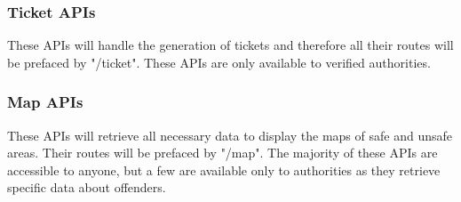 \subsubsection{Ticket APIs}
These APIs will handle the generation of tickets and therefore all their routes will be prefaced by "/ticket". These APIs are only available to verified authorities.

\subsubsection{Map APIs}
These APIs will retrieve all necessary data to display the maps of safe and unsafe areas. Their routes will be prefaced by "/map". The majority of these APIs are accessible to anyone, but a few are available only to authorities as they retrieve specific data about offenders.